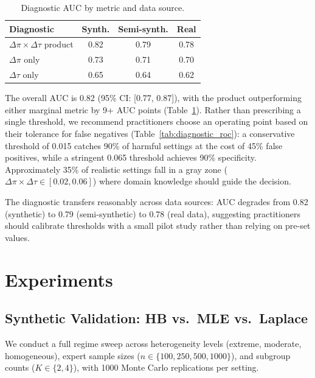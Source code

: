 \documentclass[11pt,a4paper]{article}
\begin{document}
\begin{table}[t]
\centering
\small
\caption{Diagnostic AUC by metric and data source.}
\label{tab:diagnostic_auc}
\begin{tabular}{lccc}
\toprule
Diagnostic & Synth. & Semi-synth. & Real \\
\midrule
$\Delta\pi \times \Delta\tau$ product & 0.82 & 0.79 & 0.78 \\
$\Delta\pi$ only & 0.73 & 0.71 & 0.70 \\
$\Delta\tau$ only & 0.65 & 0.64 & 0.62 \\
\bottomrule
\end{tabular}
\end{table}

The overall AUC is 0.82 (95\% CI: [0.77, 0.87]), with the product outperforming either marginal metric by 9+ AUC points (Table~\ref{tab:diagnostic_auc}).
Rather than prescribing a single threshold, we recommend practitioners choose an operating point based on their tolerance for false negatives (Table~\ref{tab:diagnostic_roc}):
a conservative threshold of 0.015 catches 90\% of harmful settings at the cost of 45\% false positives, while a stringent 0.065 threshold achieves 90\% specificity.
Approximately 35\% of realistic settings fall in a gray zone ($\Delta\pi \times \Delta\tau \in [0.02, 0.06]$) where domain knowledge should guide the decision.

The diagnostic transfers reasonably across data sources: AUC degrades from 0.82 (synthetic) to 0.79 (semi-synthetic) to 0.78 (real data), suggesting practitioners should calibrate thresholds with a small pilot study rather than relying on pre-set values.

\section{Experiments}
\label{sec:experiments}

\subsection{Synthetic Validation: HB vs.\ MLE vs.\ Laplace}
\label{sec:synthetic}

We conduct a full regime sweep across heterogeneity levels (extreme, moderate, homogeneous), expert sample sizes ($n \in \{100, 250, 500, 1000\}$), and subgroup counts ($K \in \{2, 4\}$), with 1000 Monte Carlo replications per setting.
\end{document}
